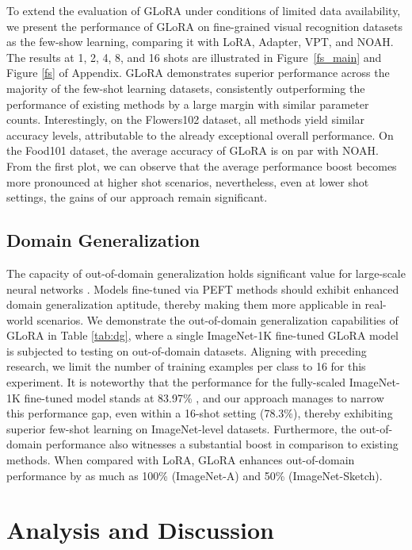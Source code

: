 To extend the evaluation of GLoRA under conditions of limited data availability, we present the performance of GLoRA on fine-grained visual recognition datasets as the few-show learning, comparing it with LoRA, Adapter, VPT, and NOAH. The results at 1, 2, 4, 8, and 16 shots are illustrated in Figure~\ref{fs_main} and Figure \ref{fs} of Appendix. GLoRA demonstrates superior performance across the majority of the few-shot learning datasets, consistently outperforming the performance of existing methods by a large margin with similar parameter counts. Interestingly, on the Flowers102 dataset, all methods yield similar accuracy levels, attributable to the already exceptional overall performance. On the Food101 dataset, the average accuracy of GLoRA is on par with NOAH. From the first plot, we can observe that the average performance boost becomes more pronounced at higher shot scenarios, nevertheless, even at lower shot settings, the gains of our approach remain significant.

\subsection{Domain Generalization}

The capacity of out-of-domain generalization holds significant value for large-scale neural networks \citep{zhou2021domain}. Models fine-tuned via PEFT methods should exhibit enhanced domain generalization aptitude, thereby making them more applicable in real-world scenarios. We demonstrate the out-of-domain generalization capabilities of GLoRA in Table \ref{tab:dg}, where a single ImageNet-1K \citep{deng2009imagenet} fine-tuned GLoRA model is subjected to testing on out-of-domain datasets. Aligning with preceding research, we limit the number of training examples per class to 16 for this experiment. It is noteworthy that the performance for the fully-scaled ImageNet-1K fine-tuned model stands at 83.97\% \citep{dosovitskiyimage}, and our approach manages to narrow this performance gap, even within a 16-shot setting (78.3\%), thereby exhibiting superior few-shot learning on ImageNet-level datasets. Furthermore, the out-of-domain performance also witnesses a substantial boost in comparison to existing methods. When compared with LoRA, GLoRA enhances out-of-domain performance by as much as 100\% (ImageNet-A) and 50\% (ImageNet-Sketch).

\section{Analysis and Discussion}
\label{discussion}

